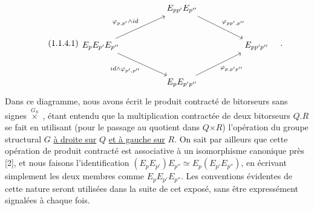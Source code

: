 \begin{equation}\tag{1.1.4.1}
\begin{tikzcd}[column sep=huge, row sep=large]
 & E_{pp'}E_{p''} \arrow[dr, "{\varphi_{pp',p''}}"] & \\
E_{p}E_{p'}E_{p''} \arrow[ur, "{\varphi_{p,p'}\wedge id}"] \arrow[dr, "{id\wedge\varphi_{p',p''}}"'] & & E_{pp'p''} \\
 & E_{p}E_{p'p''} \arrow[ur, "{\varphi_{p,p'p''}}"'] &
\end{tikzcd}\quad .
\end{equation}
Dans ce diagramme, nous avons écrit le produit contracté de bitorseurs sans signes $\overset{G_S}{\times}$ , étant entendu que la multiplication contractée de deux bitorseurs $Q.R$ se fait en utilisant (pour le passage au quotient dans $Q$$\times$$R$) l'opération du groupe structural $G$ \underline{à droite sur} $Q$ \underline{et à gauche sur} $R$. On sait par ailleurs que cette opération de produit contracté est associative à un isomorphisme canonique près [2], et nous faisons l'identification $(E_{p}E_{p'})E_{p''} \simeq E_{p}(E_{p'}E_{p''})$, en écrivant simplement les deux membres comme $E_{p}E_{p'}E_{p''}$. Les conventions évidentes de cette nature seront utilisées dans la suite de cet exposé, sans être expressément signalées à chaque fois.

